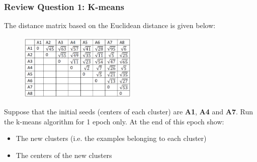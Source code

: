 \documentclass[aspectratio=169, 10pt]{beamer}
\begin{document}
\begin{frame}[t]
    \frametitle{Review Question 1: K-means}
    \small
    
    The distance matrix based on the Euclidean distance is given below:
    
    \begin{figure}
        \centering
        \includegraphics[width=0.5\textwidth]{../imgs/k-mean_review_q1.png}
    \end{figure}

    Suppose that the initial seeds (centers of each cluster) are \textbf{A1}, \textbf{A4} and \textbf{A7}. 
    Run the k-means algorithm for 1 epoch only. At the end of this epoch show:
    \begin{itemize}
        \item The new clusters (i.e. the examples belonging to each cluster)
        \item The centers of the new clusters
    \end{itemize}

\end{frame}
\end{document}
